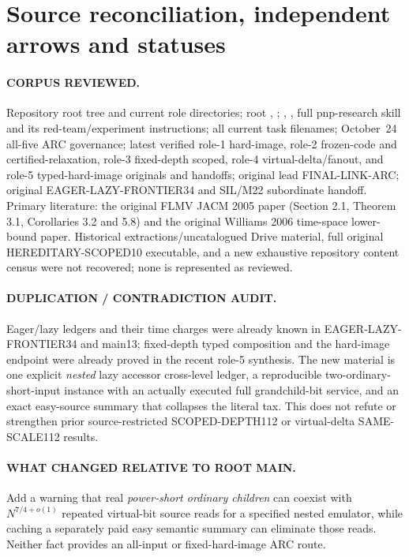 \documentclass[11pt]{article}
\begin{document}
\section{Source reconciliation, independent arrows and statuses}
\paragraph{CORPUS REVIEWED.}
Repository root tree and current role directories; root
, ; ,
, full pnp-research skill and its red-team/experiment
instructions; all current task filenames; October~24 all-five
ARC governance; latest verified role-1 hard-image, role-2
frozen-code and certified-relaxation, role-3 fixed-depth scoped,
role-4 virtual-delta/fanout, and role-5 typed-hard-image originals
and handoffs; original lead FINAL-LINK-ARC; original
EAGER-LAZY-FRONTIER34 and SIL/M22 subordinate handoff.
Primary literature: the original FLMV JACM 2005 paper
(Section 2.1, Theorem 3.1, Corollaries 3.2 and 5.8) and
the original Williams 2006 time-space lower-bound paper.
Historical extractions/uncatalogued Drive material, full original
HEREDITARY-SCOPED10 executable, and a new exhaustive repository
content census were not recovered; none is represented as reviewed.

\paragraph{DUPLICATION / CONTRADICTION AUDIT.}
Eager/lazy ledgers and their time charges were already known in
EAGER-LAZY-FRONTIER34 and main13; fixed-depth typed composition and
the hard-image endpoint were already proved in the recent role-5
synthesis. The new material is one explicit \emph{nested} lazy
accessor cross-level ledger, a reproducible two-ordinary-short-input
instance with an actually executed full grandchild-bit service,
and an exact easy-source summary that collapses the literal tax.
This does not refute or strengthen prior source-restricted
SCOPED-DEPTH112 or virtual-delta SAME-SCALE112 results.

\paragraph{WHAT CHANGED RELATIVE TO ROOT MAIN.}
Add a warning that real \emph{power-short ordinary children} can
coexist with \(N^{7/4+o(1)}\) repeated virtual-bit source reads
for a specified nested emulator, while caching a separately paid
easy semantic summary can eliminate those reads. Neither fact
provides an all-input or fixed-hard-image ARC route.
\end{document}
